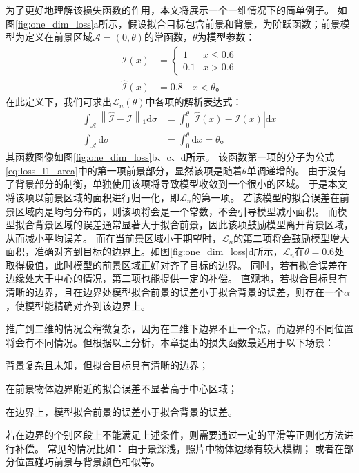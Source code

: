 为了更好地理解该损失函数的作用，本文将展示一个一维情况下的简单例子。
如图\ref{fig:one_dim_loss}a所示，假设拟合目标包含前景和背景，为阶跃函数；前景模型为定义在前景区域$\mathcal{A}=(0,\theta)$的常函数，$\theta$为模型参数：
\begin{align}
\mathcal{I}(x) &= \begin{cases}
    1   & x \leq 0.6 \\
    0.1 & x > 0.6
\end{cases}\\
\hat{\mathcal{I}}(x) &= 0.8 \quad x < \theta
\text{。}
\end{align}
在此定义下，我们可求出$\mathcal{L}_n(\theta)$中各项的解析表达式：
\begin{align}
\int_{\mathcal{A}} \left\| \hat{\mathcal{I}} - \mathcal{I} \right\|_1 \mathrm{d}\sigma
&= \int_0^{\theta} \left| \hat{\mathcal{I}}(x) - \mathcal{I}(x) \right| \mathrm{d}x \\
\int_{\mathcal{A}}\mathrm{d}\sigma &= \int_0^{\theta} \mathrm{d}x = \theta
\text{。}
\end{align}
其函数图像如图\ref{fig:one_dim_loss}b、c、d所示。
该函数第一项的分子为公式\ref{eq:loss_l1_area}中的第一项前景部分，显然该项是随着$\theta$单调递增的。
由于没有了背景部分的制衡，单独使用该项将导致模型收敛到一个很小的区域。
于是本文将该项以前景区域的面积进行归一化，即$\mathcal{L}_n$的第一项。
若该模型的拟合误差在前景区域内是均匀分布的，则该项将会是一个常数，不会引导模型减小面积。
而模型拟合背景区域的误差通常显著大于拟合前景，因此该项鼓励模型离开背景区域，从而减小平均误差。
而在当前景区域小于期望时，$\mathcal{L}_n$的第二项将会鼓励模型增大面积，准确对齐到目标的边界上。如图\ref{fig:one_dim_loss}d所示，$\mathcal{L}_n$在$\theta=0.6$处取得极值，此时模型的前景区域正好对齐了目标的边界。
同时，若有拟合误差在边缘处大于中心的情况，第二项也能提供一定的补偿。
直观地，若拟合目标具有清晰的边界，且在边界处模型拟合前景的误差小于拟合背景的误差，则存在一个$\alpha$，使模型能精确对齐到该边界上。

推广到二维的情况会稍微复杂，因为在二维下边界不止一个点，而边界的不同位置将会有不同情况。但根据以上分析，本章提出的损失函数最适用于以下场景：
\begin{enumerate*}
    \item 背景复杂且未知，但拟合目标具有清晰的边界；
    \item 在前景物体边界附近的拟合误差不显著高于中心区域；
    \item 在边界上，模型拟合前景的误差小于拟合背景的误差。
\end{enumerate*}
若在边界的个别区段上不能满足上述条件，则需要通过一定的平滑等正则化方法进行补偿。
常见的情况比如：
由于景深浅，照片中物体边缘有较大模糊；
或者在部分位置碰巧前景与背景颜色相似等。

